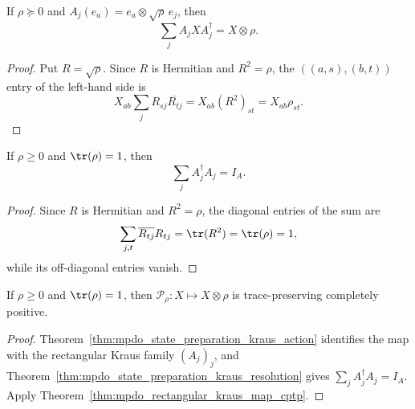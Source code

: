 \begin{theorem}
    \label{thm:mpdo_state_preparation_kraus_action}
    \leanok
    If $\rho\succeq0$ and $A_j(e_a)=e_a\otimes\sqrt\rho\,e_j$, then
    \[
        \sum_j A_jXA_j^\dagger=X\otimes\rho.
    \]
\end{theorem}
\begin{proof}
    \leanok
    Put $R=\sqrt\rho$. Since $R$ is Hermitian and $R^2=\rho$, the
    $((a,s),(b,t))$ entry of the left-hand side is
    \[
        X_{ab}\sum_jR_{sj}\overline{R_{tj}}
        =X_{ab}(R^2)_{st}=X_{ab}\rho_{st}.
    \]
\end{proof}

\begin{theorem}
    \label{thm:mpdo_state_preparation_kraus_resolution}
    \leanok
    If $\rho\geq0$ and $\tr(\rho)=1$, then
    \[
        \sum_j A_j^\dagger A_j=I_A.
    \]
\end{theorem}
\begin{proof}
    \leanok
    Since $R$ is Hermitian and $R^2=\rho$, the diagonal entries of the sum are
    \[
        \sum_{j,t}\overline{R_{tj}}R_{tj}
        =\tr(R^2)=\tr(\rho)=1,
    \]
    while its off-diagonal entries vanish.
\end{proof}

\begin{lemma}
    \label{lem:mpdo_state_preparation_cptp}
    \leanok
    If $\rho\geq0$ and $\tr(\rho)=1$, then
    $\mathcal P_\rho:X\mapsto X\otimes\rho$ is trace-preserving completely
    positive.
\end{lemma}

\begin{proof}
    \leanok
    Theorem~\ref{thm:mpdo_state_preparation_kraus_action} identifies the map
    with the rectangular Kraus family $(A_j)_j$, and
    Theorem~\ref{thm:mpdo_state_preparation_kraus_resolution} gives
    $\sum_j A_j^\dagger A_j=I_A$. Apply
    Theorem~\ref{thm:mpdo_rectangular_kraus_map_cptp}.
\end{proof}

